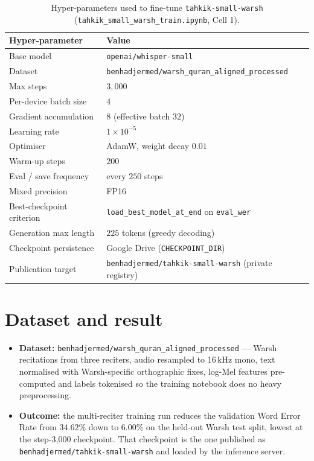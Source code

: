 \begin{table}[H]
  \centering
  \caption{Hyper-parameters used to fine-tune \texttt{tahkik-small-warsh}
  (\texttt{tahkik\_small\_warsh\_train.ipynb}, Cell 1).}
  \label{tab:app_training_hp}
  \renewcommand{\arraystretch}{1.3}
  \begin{tabular}{ll}
    \toprule
    \textbf{Hyper-parameter} & \textbf{Value} \\
    \midrule
    Base model                & \texttt{openai/whisper-small} \\
    Dataset                   & \texttt{benhadjermed/warsh\_quran\_aligned\_processed} \\
    Max steps                 & $3{,}000$ \\
    Per-device batch size     & $4$ \\
    Gradient accumulation     & $8$ \quad (effective batch $32$) \\
    Learning rate             & $1\times 10^{-5}$ \\
    Optimiser                 & AdamW, weight decay $0.01$ \\
    Warm-up steps             & $200$ \\
    Eval / save frequency     & every $250$ steps \\
    Mixed precision           & FP16 \\
    Best-checkpoint criterion & \texttt{load\_best\_model\_at\_end} on \texttt{eval\_wer} \\
    Generation max length     & $225$ tokens (greedy decoding) \\
    Checkpoint persistence    & Google Drive (\texttt{CHECKPOINT\_DIR}) \\
    Publication target        & \texttt{benhadjermed/tahkik-small-warsh} (private registry) \\
    \bottomrule
  \end{tabular}
\end{table}

\section{Dataset and result}
\label{sec:app_training_result}

\begin{itemize}
  \item \textbf{Dataset:} \texttt{benhadjermed/warsh\_quran\_aligned\_processed}
        --- Warsh recitations from three reciters, audio resampled to
        16\,kHz mono, text normalised with Warsh-specific orthographic
        fixes, log-Mel features pre-computed and labels tokenised so
        the training notebook does no heavy preprocessing.
  \item \textbf{Outcome:} the multi-reciter training run reduces the
        validation Word Error Rate from $34.62\%$ down to
        $\mathbf{6.00\%}$ on the held-out Warsh test split, lowest at
        the step-3{,}000 checkpoint. That checkpoint is the one
        published as \texttt{benhadjermed/tahkik-small-warsh} and
        loaded by the inference server.
\end{itemize}
